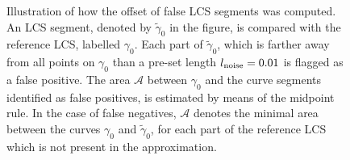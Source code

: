 \begin{figure}[htpb]
    \centering
    \def\svgwidth{0.8\linewidth}
    
    \caption[Illustration of how the offset of false LCS segments was computed]%
    {Illustration of how the offset of false LCS segments was computed.
        An LCS segment, denoted by $\widetilde{\gamma}_{0}$ in the figure, is
        compared with the reference LCS, labelled $\gamma_{0}$. Each part of
        $\widetilde{\gamma}_{0}$, which is farther away from all points on $\gamma_{0}$
        than a pre-set length $l_{\textnormal{noise}}=0.01$ is flagged as a
        false positive. The area $\mathcal{A}$ between $\gamma_{0}$ and the
        curve segments identified as false positives, is estimated by means of the
        midpoint rule. In the case of false negatives, $\mathcal{A}$ denotes the
        minimal area between the curves $\gamma_{0}$ and $\widetilde{\gamma}_{0}$,
        for each part of the reference LCS which is not present in the
    approximation.}
    \label{fig:fp_fn_principle}
\end{figure}

